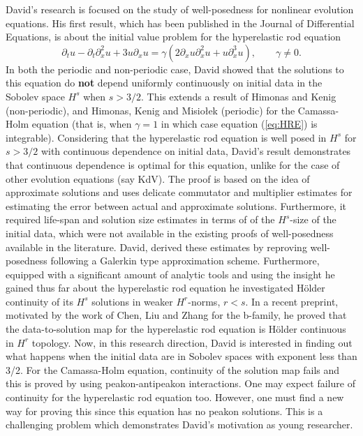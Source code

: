David's  research is focused on the study of well-posedness for nonlinear 
evolution equations. His  first result, which has been  published in 
the Journal of Differential Equations, 
 is about the initial value problem for 
the hyperelastic rod equation 
%
\begin{equation}
\label{eq:HRE}
\partial_t u-\partial_t\partial_x^2u+3u\partial_x u=\gamma\left(2\partial_x u\partial_x^2 u+u\partial_x^3 u\right),
\qquad  \gamma\neq 0.
\end{equation}
%
In both the periodic and non-periodic case,
David   showed that the solutions to this equation do {\bf not} depend uniformly continuously on initial data in the  Sobolev space $H^s$ when $s>3/2$.
This extends a result  of  Himonas and Kenig (non-periodic),
and Himonas, Kenig and  Misio\l ek (periodic)  for   the Camassa-Holm 
equation (that is,   when  $\gamma = 1$ in which case  equation (\ref{eq:HRE}) is integrable).
Considering  that  the  hyperelastic rod equation  is well posed 
in $H^s$ for $s>3/2$   with continuous dependence on initial data,
David's result demonstrates that continuous dependence
is optimal  for this equation, unlike for the case of other 
evolution equations (say KdV).
The proof  is based on the idea of approximate solutions 
and  uses  delicate commutator and multiplier estimates
for estimating the error between actual and approximate
solutions. Furthermore, it required  life-span and solution size 
estimates in terms of of the $H^s$-size of the initial data,
which  were not available in the existing proofs 
of well-posedness available in the literature.
David, derived these  estimates by reproving well-posedness 
following a Galerkin type approximation scheme.
Furthermore, equipped with a  significant amount of analytic tools 
and  using the insight he gained thus far about the hyperelastic rod equation 
he investigated H\"older continuity of its $H^s$ solutions
in  weaker  $H^r$-norms, $r<s$. 
In a recent preprint, motivated by the work of  Chen,  Liu and Zhang
for the b-family, he proved that the data-to-solution map for  the hyperelastic rod equation 
is  H\"older continuous in $H^r$ topology.
Now, in this research  direction,  David is interested in finding out
what happens  when the initial data are in Sobolev spaces 
with exponent less than 3/2.  For the Camassa-Holm equation,
 continuity of the solution map fails and this is proved by 
 using peakon-antipeakon interactions.
 One may expect  failure of continuity for 
 the hyperelastic rod equation too.
  However, one must find a new way for proving this since
this equation has no peakon solutions.
This is a challenging problem which demonstrates David's
motivation as  young researcher.

